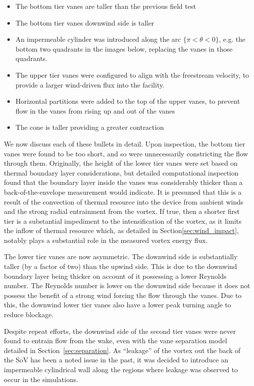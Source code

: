 \begin{itemize}
\item The bottom tier vanes are taller than the previous field test
\item The bottom tier vanes downwind side is taller 
\item An impermeable cylinder was introduced along the arc $\{\pi < \theta
      < 0 \}$, e.g. the bottom two quadrants in the images below, replacing the
vanes in those quadrants. 
\item The upper tier vanes were configured to align with the freestream
velocity, to provide a larger wind-driven flux into the facility.
\item Horizontal partitions were added to the top of the upper vanes, to
prevent flow in the vanes from rising up and out of the vanes
\item The cone is taller providing a greater contraction
\end{itemize}

We now discuss each of these bullets in detail. Upon inspection, the
bottom tier vanes were found to be too short, and so were unnecessarily
constricting the flow through them. Originally, the height of the lower
tier vanes were set based on thermal boundary layer considerations, but
detailed computational inspection found that the boundary layer inside
the vanes was considerably thicker than a back-of-the-envelope
measurement would indicate. It is presumed that this is a result of the
convection of thermal resource into the device from ambient winds and
the strong radial entrainment from the vortex. If true, then a shorter
first tier is a substantial impediment to the intensification of the
vortex, as it limits the inflow of thermal resource which, as detailed
in Section\ref{sec:wind_impact}, notably plays a substantial role in the
measured vortex energy flux. 

The lower tier vanes are now asymmetric. The downwind side
is substantially taller (by a factor of two) than the upwind side. This
is due to the downwind boundary layer being thicker on account of it
possessing a lower Reynolds number. The Reynolds number is lower on the
downwind side because it does not possess the benefit of a strong wind
forcing the flow through the vanes. Due to this, the downwind lower tier
vanes also have a lower peak turning angle to reduce blockage.

Despite repeat efforts, the downwind side of the second tier vanes were
never found to entrain flow from the wake, even with the vane separation
model detailed in Section~\ref{sec:separation}. As ``leakage'' of the
vortex out the back of the SoV has been a noted issue in the past, it
was decided to introduce an impermeable cylindrical wall along the
regions where leakage was observed to occur in the simulations. 

